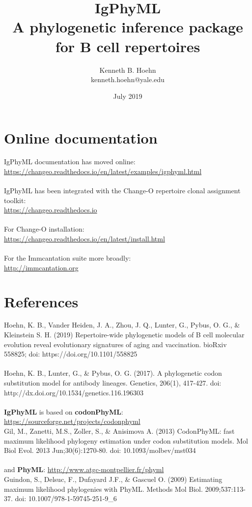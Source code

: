 \documentclass[11pt, letterpaper]{article}
\begin{document}
\sloppy
\title{IgPhyML\\A phylogenetic inference package for B cell repertoires}
\author{Kenneth B. Hoehn\\kenneth.hoehn@yale.edu}
\date{July 2019}

\maketitle


\section*{Online documentation}

IgPhyML documentation has moved online:\\ \url{https://changeo.readthedocs.io/en/latest/examples/igphyml.html}
\\~\\
IgPhyML has been integrated with the Change-O repertoire clonal assignment toolkit:\\\url{https://changeo.readthedocs.io}
\\~\\
For Change-O installation:\\
\url{https://changeo.readthedocs.io/en/latest/install.html}
\\~\\
For the Immcantation suite more broadly:\\
\url{http://immcantation.org}


\section*{References}
Hoehn, K. B., Vander Heiden, J. A., Zhou, J. Q., Lunter, G., Pybus, O. G., \& Kleinstein S. H. (2019) Repertoire-wide phylogenetic models of B cell molecular evolution reveal evolutionary signatures of aging and vaccination. bioRxiv 558825; doi: https://doi.org/10.1101/558825 
\\~\\
Hoehn, K. B., Lunter, G., \& Pybus, O. G. (2017). A phylogenetic codon substitution model for antibody lineages. Genetics, 206(1), 417-427. doi: http://dx.doi.org/10.1534/genetics.116.196303 
\\~\\
\noindent \textbf{IgPhyML} is based on \textbf{codonPhyML}: \url{https://sourceforge.net/projects/codonphyml}\\
Gil, M., Zanetti, M.S., Zoller, S., \& Anisimova A. (2013) CodonPhyML: fast maximum likelihood phylogeny estimation under codon substitution models. Mol Biol Evol. 2013 Jun;30(6):1270-80. doi: 10.1093/molbev/mst034
\\~\\
and \textbf{PhyML}: \url{http://www.atgc-montpellier.fr/phyml}\\
Guindon, S., Delsuc, F., Dufayard J.F., \& Gascuel O. (2009) Estimating maximum likelihood phylogenies with PhyML. Methods Mol Biol. 2009;537:113-37. doi: 10.1007/978-1-59745-251-9\_6
\end{document}
